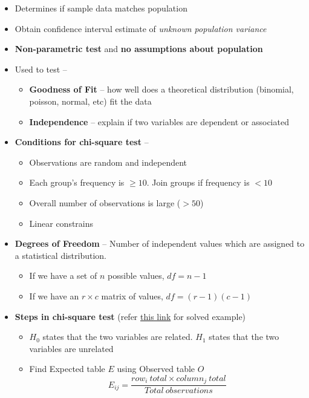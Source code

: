 \documentclass{article}
\begin{document}
\begin{itemize}
    \item Determines if sample data matches population
    \item Obtain confidence interval estimate of \textit{unknown population variance}
    \item \textbf{Non-parametric test} and \textbf{no assumptions about population}
    \item Used to test --
    \begin{itemize}
        \item \textbf{Goodness of Fit} -- how well does a theoretical distribution (binomial, poisson, normal, etc) fit the data
        \item \textbf{Independence} -- explain if two variables are dependent or associated
    \end{itemize}
    \item \textbf{Conditions for chi-square test} --
    \begin{itemize}
        \item Observations are random and independent
        \item Each group's frequency is $\ge 10$. Join groups if frequency is $< 10$
        \item Overall number of observations is large ($> 50$)
        \item Linear constrains
    \end{itemize}
    \item \textbf{Degrees of Freedom} -- Number of independent values which are assigned to a statistical distribution. 
    \begin{itemize}
        \item If we have a set of $n$ possible values, $df = n -1 $
        \item If we have an $r \times c$ matrix of values, $df = (r-1)(c-1)$
    \end{itemize}
    \item \textbf{Steps in chi-square test} (refer \href{https://www.simplilearn.com/tutorials/statistics-tutorial/chi-square-test}{this link} for solved example)
    \begin{itemize}
        \item $H_0$ states that the two variables are related. $H_1$ states that the two variables are unrelated
        \item Find Expected table $E$ using Observed table $O$
        \begin{equation}
            E_{ij} = \frac{row_i\ total \times column_j\ total}{Total\ observations}

\end{equation}
\end{itemize}
\end{itemize}
\end{document}
